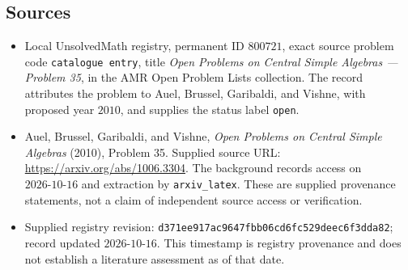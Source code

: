 \documentclass[11pt]{article}
\begin{document}
\subsection{Sources}
\begin{itemize}
\item Local UnsolvedMath registry, permanent ID \(800721\), exact source problem code \texttt{catalogue entry}, title \emph{Open Problems on Central Simple Algebras --- Problem 35}, in the AMR Open Problem Lists collection. The record attributes the problem to Auel, Brussel, Garibaldi, and Vishne, with proposed year \(2010\), and supplies the status label \texttt{open}.
\item Auel, Brussel, Garibaldi, and Vishne, \emph{Open Problems on Central Simple Algebras} (2010), Problem 35. Supplied source URL: \url{https://arxiv.org/abs/1006.3304}. The background records access on \(2026\text{-}10\text{-}16\) and extraction by \texttt{arxiv\_latex}. These are supplied provenance statements, not a claim of independent source access or verification.
\item Supplied registry revision: \texttt{d371ee917ac9647fbb06cd6fc529deec6f3dda82}; record updated \(2026\text{-}10\text{-}16\). This timestamp is registry provenance and does not establish a literature assessment as of that date.
\end{itemize}
\end{document}
